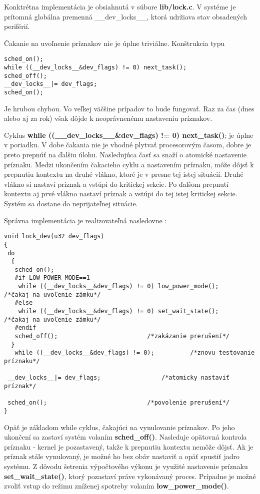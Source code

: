Konktrétna implementácia je obsiahnutá v súbore \textbf{lib/lock.c}. V systéme je prítomná globálna premenná \_\_dev\_locks\_\_, ktorá udržiava stav obsadených periférií.

Čakanie na uvoľnenie príznakov nie je úplne triviálne. Konštrukcia typu 

\newpage
{\small
\begin{verbatim}
sched_on(); 
while ((__dev_locks__&dev_flags) != 0) next_task();
sched_off(); 
__dev_locks__|= dev_flags;
sched_on(); 
\end{verbatim}
}

Je hrubou chybou. Vo veľkej väčšine prípadov to bude fungovať. Raz za čas (dnes alebo aj za rok) však dôjde k neoprávnenému nastaveniu príznakov.

Cyklus \textbf{while ((\_\_dev\_locks\_\_\&dev\_flags) != 0) next\_task()}; je úplne v poriadku. V dobe čakania nie je vhodné plytvať procesorovým časom, dobre je preto prepnúť na ďalšiu úlohu. Nasledujúca časť sa snaží o atomické nastavenie príznaku. Medzi ukončením čakacieho cyklu a nastavením príznaku, môže dôjsť k prepnutiu kontextu na druhé vlákno, ktoré je v presne tej istej situácií. Druhé vlákno si nastaví príznak a vstúpi do kritickej sekcie. Po ďalšom prepnutí kontextu aj prvé vlákno nastaví príznak a vstúpi do tej istej kritickej sekcie. Systém sa dostane do neprijateľnej situácie.


Správna implementácia je realizovateľná nasledovne :
{\small
\begin{verbatim}
void lock_dev(u32 dev_flags)
{
 do
  {
   sched_on(); 
   #if LOW_POWER_MODE==1
    while ((__dev_locks__&dev_flags) != 0) low_power_mode();	/*čakaj na uvoľenie zámku*/
   #else
    while ((__dev_locks__&dev_flags) != 0) set_wait_state();	/*čakaj na uvoľenie zámku*/
   #endif
   sched_off();							/*zakázanie prerušení*/
  }
   while ((__dev_locks__&dev_flags) != 0);			/*znovu testovanie príznaku*/
	
 __dev_locks__|= dev_flags;					/*atomicky nastaviť príznak*/

 sched_on(); 							/*povolenie prerušení*/
}
\end{verbatim}
}

Opäť je základom while cyklus, čakajúci na vynulovanie príznakov. Po jeho ukončení sa zastaví systém volaním \textbf{sched\_off()}. Nasleduje opätovná kontrola príznaku - kernel je pozastavený, takže k prepnutiu kontextu nemôže dôjsť. Ak je príznak stále vynulovaný, je možné ho bez obáv nastaviť a opäť spustiť jadro systému.
Z dôvodu šetrenia výpočtového výkonu je využité nastavenie príznaku \textbf{set\_wait\_state()}, ktorý pozastaví práve vykonávaný proces. Prípadne je možné zvoliť vstup do režimu zníženej spotreby volaním \textbf{low\_power\_mode()}.

